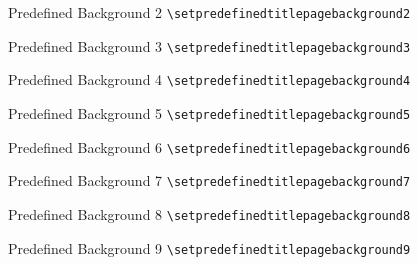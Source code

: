 \documentclass[english,sectioncirclenumberstyle]{ciadbeamer}
\begin{document}
\begin{frame}{{Predefined Background} 2}
	\centering\texttt{{\textbackslash}setpredefinedtitlepagebackground2} \\[.5cm]
\end{frame}

\begin{frame}{{Predefined Background} 3}
	\centering\texttt{{\textbackslash}setpredefinedtitlepagebackground3} \\[.5cm]
\end{frame}

\begin{frame}{{Predefined Background} 4}
	\centering\texttt{{\textbackslash}setpredefinedtitlepagebackground4} \\[.5cm]
\end{frame}

\begin{frame}{{Predefined Background} 5}
	\centering\texttt{{\textbackslash}setpredefinedtitlepagebackground5} \\[.5cm]
\end{frame}

\begin{frame}{{Predefined Background} 6}
	\centering\texttt{{\textbackslash}setpredefinedtitlepagebackground6} \\[.5cm]
\end{frame}

\begin{frame}{{Predefined Background} 7}
	\centering\texttt{{\textbackslash}setpredefinedtitlepagebackground7} \\[.5cm]
\end{frame}

\begin{frame}{{Predefined Background} 8}
	\centering\texttt{{\textbackslash}setpredefinedtitlepagebackground8} \\[.5cm]
\end{frame}

\begin{frame}{{Predefined Background} 9}
	\centering\texttt{{\textbackslash}setpredefinedtitlepagebackground9} \\[.5cm]
\end{frame}
\end{document}
